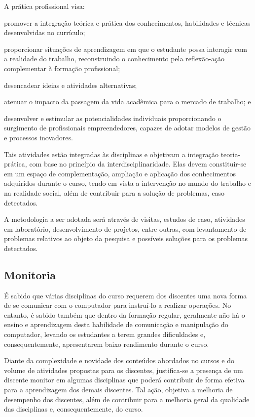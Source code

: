\documentclass[
	12pt,				%
	openright,			%
	twoside,			%
	a4paper,			%
	chapter=TITLE,		%
	english,			%
	french,				%
	spanish,			%
	brazil,				%
	]{abntex2}
\begin{document}
A prática profissional visa:
\begin{alineas}
	\item promover a integração teórica e prática dos conhecimentos, habilidades e
técnicas desenvolvidas no currículo;
	\item proporcionar situações de aprendizagem em que o estudante possa
interagir com a realidade do trabalho, reconstruindo o conhecimento pela
reflexão-ação complementar à formação profissional;
	\item desencadear ideias e atividades alternativas;
	\item atenuar o impacto da passagem da vida acadêmica para o mercado de
trabalho; e
	\item desenvolver e estimular as potencialidades individuais proporcionando o
surgimento de profissionais empreendedores, capazes de adotar modelos
de gestão e processos inovadores. 
	 	
\end{alineas}

Tais atividades estão integradas às disciplinas e objetivam a integração teoria-
prática, com base no princípio da interdisciplinaridade. Elas devem constituir-se em
um espaço de complementação, ampliação e aplicação dos conhecimentos adquiridos
durante o curso, tendo em vista a intervenção no mundo do trabalho e na realidade
social, além de contribuir para a solução de problemas, caso detectados.


A metodologia a ser adotada será através de visitas, estudos de caso,
atividades em laboratório, desenvolvimento de projetos, entre outras, com
levantamento de problemas relativos ao objeto da pesquisa e possíveis soluções para
os problemas detectados.


\subsection{Monitoria}

É sabido que várias disciplinas do curso  requerem dos discentes  uma nova forma de se comunicar com o computador para instruí-lo a realizar operações. No entanto, é sabido também que dentro da formação regular, geralmente não há o ensino e aprendizagem desta  habilidade de comunicação e manipulação do computador,  levando os estudantes a terem grandes dificuldades e, consequentemente, apresentarem baixo rendimento durante o curso.

Diante da complexidade e novidade dos conte\'udos abordados no cursos e do  volume de atividades propostas para os discentes, justifica-se a presen\c{c}a de um discente monitor em algumas disciplinas que poder\'a contribuir de forma efetiva para a aprendizagem dos demais discentes. Tal a\c{c}\~ao, objetiva a melhoria de  desempenho dos discentes, al\'em de contribuir para a melhoria geral da qualidade das disciplinas e, consequentemente, do curso. 
\end{document}
